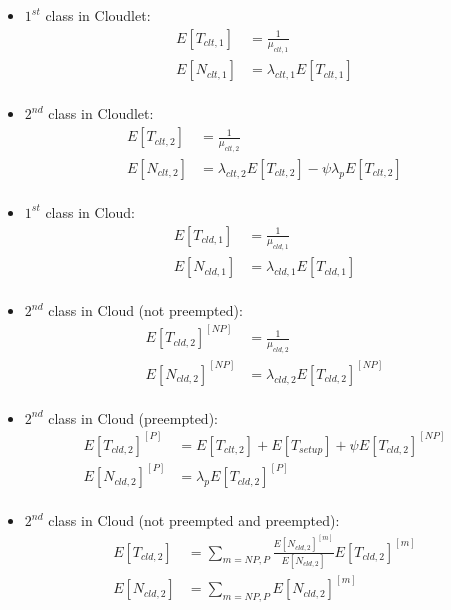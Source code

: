 \begin{itemize}
	\item $1^{st}$ class in Cloudlet:
	\begin{equation} 
	\begin{split}
	E[T_{clt,1}] &= \frac{1}{\mu_{clt,1}} \\
	E[N_{clt,1}] &= \lambda_{clt,1}E[T_{clt,1}] \\
	\end{split}
	\end{equation}

	\item $2^{nd}$ class in Cloudlet:
	\begin{equation} 
	\begin{split}
	E[T_{clt,2}] &= \frac{1}{\mu_{clt,2}} \\
	E[N_{clt,2}] &= \lambda_{clt,2}E[T_{clt,2}]-\psi\lambda_{p}E[T_{clt,2}] \\
	\end{split}
	\end{equation}
	
	\item $1^{st}$ class in Cloud:
	\begin{equation} 
	\begin{split}
	E[T_{cld,1}] &= \frac{1}{\mu_{cld,1}} \\
	E[N_{cld,1}] &= \lambda_{cld,1}E[T_{cld,1}] \\
	\end{split}
	\end{equation}
	
	\item $2^{nd}$ class in Cloud (not preempted):
	\begin{equation} 
	\begin{split}
	E[T_{cld,2}]^{[NP]} &= \frac{1}{\mu_{cld,2}} \\
	E[N_{cld,2}]^{[NP]} &= \lambda_{cld,2}E[T_{cld,2}]^{[NP]} \\
	\end{split}
	\end{equation}
	
	\item $2^{nd}$ class in Cloud (preempted):
	\begin{equation} 
	\begin{split}
	E[T_{cld,2}]^{[P]} &= E[T_{clt,2}]+E[T_{setup}]+\psi E[T_{cld,2}]^{[NP]} \\
	E[N_{cld,2}]^{[P]} &= \lambda_{p}E[T_{cld,2}]^{[P]} \\
	\end{split}
	\end{equation}
	
	\item $2^{nd}$ class in Cloud (not preempted and preempted):
	\begin{equation} 
	\begin{split}
	E[T_{cld,2}] &= \sum_{m=NP,P}\frac{E[N_{cld,2}]^{[m]}}{E[N_{cld,2}]}E[T_{cld,2}]^{[m]} \\
	E[N_{cld,2}] &= \sum_{m=NP,P}E[N_{cld,2}]^{[m]} \\
	\end{split}
	\end{equation}
\end{itemize}

